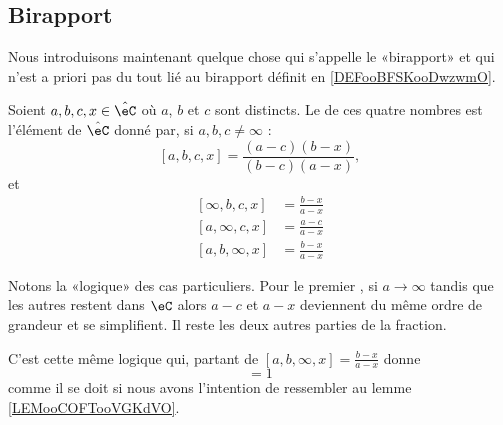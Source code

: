 \subsection{Birapport}

Nous introduisons maintenant quelque chose qui s'appelle le «birapport» et qui n'est a priori pas du tout lié au birapport définit en \ref{DEFooBFSKooDwzwmO}.

\begin{definition}
    Soient \( a,b,c,x\in \hat\eC\) où \( a\), \( b\) et \( c\) sont distincts. Le  de ces quatre nombres est l'élément de \( \hat\eC\) donné par, si \( a,b,c\neq \infty\) :
    \begin{equation}        \label{EQooQJWZooOXKslh}
        [a,b,c,x]=\frac{ (a-c)(b-x) }{ (b-c)(a-x) },
    \end{equation}
    et
    \begin{subequations}
        \begin{align}
            [\infty,b,c,x]&=\frac{ b-x }{ a-x }\\
            [a,\infty,c,x]&=\frac{a-c}{a-x}\\
            [a,b,\infty,x]&=\frac{ b-x }{ a-x }
        \end{align}
    \end{subequations}
\end{definition}

\begin{normaltext}
    Notons la «logique» des cas particuliers. Pour le premier%
    , si \( a\to\infty\) tandis que les autres restent dans \( \eC\) alors \( a-c\) et \( a-x\) deviennent du même ordre de grandeur et se simplifient. Il reste les deux autres parties de la fraction.

    C'est cette même logique qui, partant de \( [a,b,\infty,x]=\frac{ b-x }{ a-x }\) donne
    \begin{equation}
        [a,b,\infty,\infty]=1
    \end{equation}
    comme il se doit si nous avons l'intention de ressembler au lemme \ref{LEMooCOFTooVGKdVO}.
\end{normaltext}

